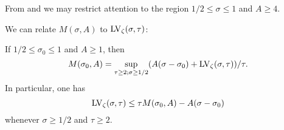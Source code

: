 From  and  we may restrict attention to the region $1/2 \leq \sigma \leq 1$ and $A \geq 4$.

We can relate $M(\sigma,A)$ to $\mathrm{LV}_\zeta(\sigma,\tau)$:

\begin{lemma}\label{mad}  If $1/2 \leq \sigma_0 \leq 1$ and $A \geq 1$, then
\begin{equation}\label{M-form}
 M(\sigma_0,A) = \sup_{\tau \geq 2; \sigma \geq 1/2} (A(\sigma-\sigma_0) + \mathrm{LV}_\zeta(\sigma,\tau))/\tau.
\end{equation}
In particular, one has
$$ \mathrm{LV}_\zeta(\sigma,\tau) \leq \tau M(\sigma_0,A) - A(\sigma-\sigma_0)$$
whenever $\sigma \geq 1/2$ and $\tau \geq 2$.
\end{lemma}


